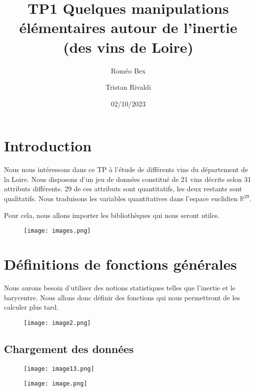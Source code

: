 \documentclass{article}
\title{TP1 Quelques manipulations élémentaires autour de l'inertie (des vins de Loire)}
\author{Roméo Bex \and Tristan Rivaldi}
\date{02/10/2023}
\begin{document}
\maketitle

\section{Introduction}

Nous nous intéressons dans ce TP à l'étude de différents vins du département de la Loire. Nous disposons d'un jeu de données constitué de 21 vins décrits selon 31 attributs différents. 29 de ces attributs sont quantitatifs, les deux restants sont qualitatifs. Nous traduisons les variables quantitatives dans l'espace euclidien \(\mathbb{R}^{29}\).

Pour cela, nous allons importer les bibliothèques qui nous seront utiles.

\begin{figure}[h]
    \centering
    \texttt{[image: images.png]}
    \label{fig:enter-label}
\end{figure}


\section{Définitions de fonctions générales}

Nous aurons besoin d'utiliser des notions statistiques telles que l'inertie et le barycentre. Nous allons donc définir des fonctions qui nous permettront de les calculer plus tard.

\begin{figure}[h]
    \centering
    \texttt{[image: image2.png]}
    \label{fig:enter-label}
\end{figure}

\subsection{Chargement des données}

\begin{figure}[h]
    \centering
    \texttt{[image: image13.png]}
    \label{fig:enter-label}
\end{figure}

\begin{figure}[h]
    \centering
    \texttt{[image: image.png]}
    \label{fig:enter-label}
\end{figure}
\end{document}
